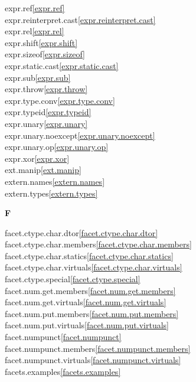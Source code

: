 \begin{multicols}{2}
expr.ref\quad\ref{expr.ref}\\
expr.reinterpret.cast\quad\ref{expr.reinterpret.cast}\\
expr.rel\quad\ref{expr.rel}\\
expr.shift\quad\ref{expr.shift}\\
expr.sizeof\quad\ref{expr.sizeof}\\
expr.static.cast\quad\ref{expr.static.cast}\\
expr.sub\quad\ref{expr.sub}\\
expr.throw\quad\ref{expr.throw}\\
expr.type.conv\quad\ref{expr.type.conv}\\
expr.typeid\quad\ref{expr.typeid}\\
expr.unary\quad\ref{expr.unary}\\
expr.unary.noexcept\quad\ref{expr.unary.noexcept}\\
expr.unary.op\quad\ref{expr.unary.op}\\
expr.xor\quad\ref{expr.xor}\\
ext.manip\quad\ref{ext.manip}\\
extern.names\quad\ref{extern.names}\\
extern.types\quad\ref{extern.types}\\
\par \textbf{F}\par
facet.ctype.char.dtor\quad\ref{facet.ctype.char.dtor}\\
facet.ctype.char.members\quad\ref{facet.ctype.char.members}\\
facet.ctype.char.statics\quad\ref{facet.ctype.char.statics}\\
facet.ctype.char.virtuals\quad\ref{facet.ctype.char.virtuals}\\
facet.ctype.special\quad\ref{facet.ctype.special}\\
facet.num.get.members\quad\ref{facet.num.get.members}\\
facet.num.get.virtuals\quad\ref{facet.num.get.virtuals}\\
facet.num.put.members\quad\ref{facet.num.put.members}\\
facet.num.put.virtuals\quad\ref{facet.num.put.virtuals}\\
facet.numpunct\quad\ref{facet.numpunct}\\
facet.numpunct.members\quad\ref{facet.numpunct.members}\\
facet.numpunct.virtuals\quad\ref{facet.numpunct.virtuals}\\
facets.examples\quad\ref{facets.examples}\\

\end{multicols}
